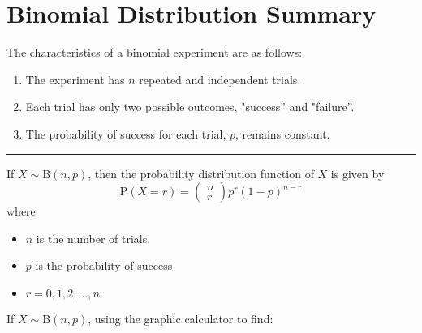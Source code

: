 \documentclass[11pt,a4paper]{book}
\begin{document}
\newpage

\section*{Binomial Distribution Summary}
The characteristics of a binomial experiment are as follows:

\begin{enumerate}[leftmargin=2cm]

\item  The experiment has $n$ repeated and independent trials.

\item  Each trial has only two possible outcomes, "success'' and
"failure''.

\item  The probability of success for each trial, $p$, remains
constant.

\end{enumerate}

\vspace{5pt}
\hrule
\vspace{6pt}

If $X\sim\text{B}\left(n,p\right)$, then the probability distribution
function of $X$ is given by 
\[
\text{P}\left(X=r\right)=\begin{pmatrix}n\\
r
\end{pmatrix}p^{r}\left(1-p\right)^{n-r}
\]
where

\begin{itemize}

\item  $n$ is the number of trials,

\item  $p$ is the probability of success

\item  $r=0,1,2,\ldots,n$

\end{itemize}

If $X\sim\text{B}\left(n,p\right)$, using the graphic calculator
to find:
\end{document}
